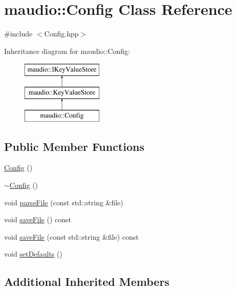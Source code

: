 \hypertarget{classmaudio_1_1Config}{\section{maudio\-:\-:Config Class Reference}
\label{classmaudio_1_1Config}
}


{\ttfamily \#include $<$Config.\-hpp$>$}

Inheritance diagram for maudio\-:\-:Config\-:\begin{figure}[H]
\begin{center}
\leavevmode
\includegraphics[height=3.000000cm]{classmaudio_1_1Config}
\end{center}
\end{figure}
\subsection*{Public Member Functions}
\begin{DoxyCompactItemize}
\item 
\hyperlink{classmaudio_1_1Config_a78661d78939a884924df4ec3f5af231d}{Config} ()
\item 
\hyperlink{classmaudio_1_1Config_a0abf7bbadd66770632a039bef0cb601a}{$\sim$\-Config} ()
\item 
void \hyperlink{classmaudio_1_1Config_aaa1bfe731a0058dc753cb7edcf048000}{parse\-File} (const std\-::string \&file)
\item 
void \hyperlink{classmaudio_1_1Config_ac30d2dbbee2fdbb63e812a5077eda0ee}{save\-File} () const 
\item 
void \hyperlink{classmaudio_1_1Config_a561024ce11c4b385afe2d7463bdd4d7a}{save\-File} (const std\-::string \&file) const 
\item 
void \hyperlink{classmaudio_1_1Config_aed5be396535c3c85176eea3fc892c0ed}{set\-Defaults} ()
\end{DoxyCompactItemize}
\subsection*{Additional Inherited Members}


